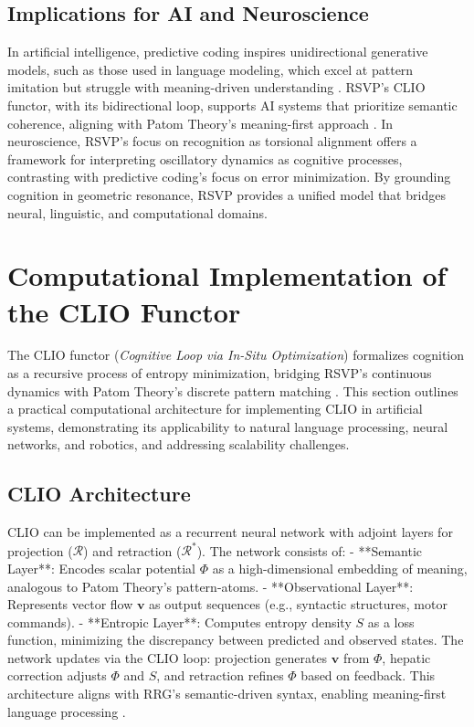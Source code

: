 \documentclass[11pt]{article}
\begin{document}
\subsection{Implications for AI and Neuroscience}
In artificial intelligence, predictive coding inspires unidirectional generative models, such as those used in language modeling, which excel at pattern imitation but struggle with meaning-driven understanding \citep{ball2019superglue}. RSVP’s CLIO functor, with its bidirectional loop, supports AI systems that prioritize semantic coherence, aligning with Patom Theory’s meaning-first approach \citep{ball2017babitasks}. In neuroscience, RSVP’s focus on recognition as torsional alignment offers a framework for interpreting oscillatory dynamics as cognitive processes, contrasting with predictive coding’s focus on error minimization. By grounding cognition in geometric resonance, RSVP provides a unified model that bridges neural, linguistic, and computational domains.

\section{Computational Implementation of the CLIO Functor}
\label{sec:clio-implementation}
The CLIO functor (\textit{Cognitive Loop via In-Situ Optimization}) formalizes cognition as a recursive process of entropy minimization, bridging RSVP’s continuous dynamics with Patom Theory’s discrete pattern matching \citep{cheng2025clio}. This section outlines a practical computational architecture for implementing CLIO in artificial systems, demonstrating its applicability to natural language processing, neural networks, and robotics, and addressing scalability challenges.

\subsection{CLIO Architecture}
CLIO can be implemented as a recurrent neural network with adjoint layers for projection ($\mathcal{R}$) and retraction ($\mathcal{R}^\ast$). The network consists of:
- **Semantic Layer**: Encodes scalar potential $\Phi$ as a high-dimensional embedding of meaning, analogous to Patom Theory’s pattern-atoms.
- **Observational Layer**: Represents vector flow $\mathbf{v}$ as output sequences (e.g., syntactic structures, motor commands).
- **Entropic Layer**: Computes entropy density $S$ as a loss function, minimizing the discrepancy between predicted and observed states.
The network updates via the CLIO loop: projection generates $\mathbf{v}$ from $\Phi$, hepatic correction adjusts $\Phi$ and $S$, and retraction refines $\Phi$ based on feedback. This architecture aligns with RRG’s semantic-driven syntax, enabling meaning-first language processing \citep{vanvalin2005exploring}.
\end{document}
